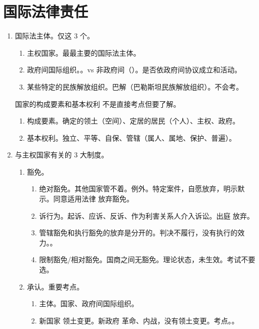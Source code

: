 \section{国际法律责任}
\begin{enumerate}
  \item 国际法主体。仅这 3 个。
        \begin{enumerate}
          \item 主权国家。最最主要的国际法主体。
          \item 政府间国际组织。。vs 非政府间（）。是否依政府间协议成立和活动。
          \item 某些特定的民族解放组织。巴解（巴勒斯坦民族解放组织）。不会考。
        \end{enumerate}

        \begin{kk}{国家的构成要素和基本权利}
          不是直接考点但要了解。
          \begin{enumerate}
            \item 构成要素。确定的领土（空间）、定居的居民（个人）、主权、政府。
            \item 基本权利。独立、平等、自保、管辖（属人、属地、保护、普遍）。
          \end{enumerate}
        \end{kk}
  \item 与主权国家有关的 3 大制度。
        \begin{enumerate}
          \item 豁免。
                \begin{enumerate}
                  \item 绝对豁免。其他国家管不着。例外。特定案件，自愿放弃，明示默示。同意适用法律 \bdy 放弃豁免。
                  \item 诉行为。起诉、应诉、反诉、作为利害关系人介入诉讼。出庭 \bdy 放弃。
                  \item 管辖豁免和执行豁免的放弃是分开的。判决不履行，没有执行的效力。。
                  \item 限制豁免/相对豁免。国商之间无豁免。理论状态，未生效。考试不要选。
                \end{enumerate}
          \item 承认。重要考点。
                \begin{enumerate}
                  \item 主体。国家、政府间国际组织。
                  \item 新国家 \yjt 领土变更。新政府 \yjt 革命、内战，没有领土变更。考点。。

\end{enumerate}
\end{enumerate}
\end{enumerate}
